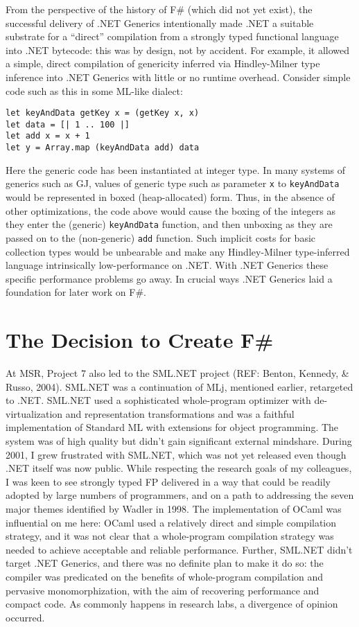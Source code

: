 \documentclass[acmsmall,review]{acmart}\settopmatter{printfolios=true,printccs=false,printacmref=false}
\begin{document}
From the perspective of the history of F\# (which did not yet exist), the successful delivery of .NET Generics intentionally made .NET a suitable substrate for a “direct” compilation from a strongly typed functional language into .NET bytecode: this was by design, not by accident. For example, it allowed a simple, direct compilation of genericity inferred via Hindley-Milner type inference into .NET Generics with little or no runtime overhead.  Consider simple code such as this in some ML-like dialect:
\begin{verbatim}
let keyAndData getKey x = (getKey x, x)
let data = [| 1 .. 100 |]
let add x = x + 1
let y = Array.map (keyAndData add) data
\end{verbatim}

Here the generic code has been instantiated at integer type. In many systems of generics such as GJ, values of generic type such as parameter \texttt{x} to \texttt{keyAndData} would be represented in boxed (heap-allocated) form.  Thus, in the absence of other optimizations, the code above would cause the boxing of the integers as they enter the (generic) \texttt{keyAndData} function, and then unboxing as they are passed on to the (non-generic) \texttt{add} function.  Such implicit costs for basic collection types would be unbearable and make any Hindley-Milner type-inferred language intrinsically low-performance on .NET. With .NET Generics these specific performance problems go away.  In crucial ways .NET Generics laid a foundation for later work on F\#.


\section*{The Decision to Create F\#}

At MSR, Project 7 also led to the SML.NET project (REF: Benton, Kennedy, \& Russo, 2004).  SML.NET was a continuation of MLj, mentioned earlier, retargeted to .NET.  SML.NET used a sophisticated whole-program optimizer with de-virtualization and representation transformations and was a faithful implementation of Standard ML with extensions for object programming. The system was of high quality but didn’t gain significant external mindshare.   During 2001, I grew frustrated with SML.NET, which was not yet released even though .NET itself was now public. While respecting the research goals of my colleagues, I was keen to see strongly typed FP delivered in a way that could be readily adopted by large numbers of programmers, and on a path to addressing the seven major themes identified by Wadler in 1998.  The implementation of OCaml was influential on me here: OCaml used a relatively direct and simple compilation strategy, and it was not clear that a whole-program compilation strategy was needed to achieve acceptable and reliable performance.  Further, SML.NET didn’t target .NET Generics, and there was no definite plan to make it do so: the compiler was predicated on the benefits of whole-program compilation and pervasive monomorphization, with the aim of recovering performance and compact code.  As commonly happens in research labs, a divergence of opinion occurred.
\end{document}
